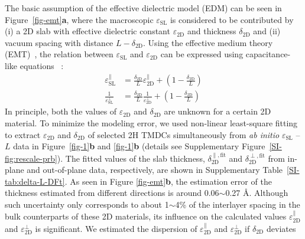 \documentclass[journal=ancac3,manuscript=article,email=true,hyperref=true,keywords=false]{achemso}
\begin{document}
The basic assumption of the effective dielectric model (EDM) can be
seen in Figure~\ref{fig-emt}\textbf{a}, where the macroscopic
$\varepsilon_{\mathrm{SL}}$ is considered to be contributed by (i) a
2D slab with effective dielectric constant $\varepsilon_{\mathrm{2D}}$
and thickness $\delta_{\mathrm{2D}}$ and (ii) vacuum spacing with
distance $L-\delta_{\mathrm{2D}}$. Using the effective medium theory
(EMT)~\cite{Aspnes_1982,Markel_2016}, the relation between
$\varepsilon_{\mathrm{SL}}$ and $\varepsilon_{\mathrm{2D}}$ can be
expressed using capacitance-like
equations~\cite{Matthes_2016,Laturia_2018} :
\begin{subequations}
  \begin{eqnarray}
    \label{eq:emt-1}
    {\displaystyle \varepsilon_{\mathrm{SL}}^{\parallel}} &= {\displaystyle \frac{\delta_{\mathrm{2D}}}{L} \varepsilon_{\mathrm{2D}}^{\parallel} + \left(1 - \frac{\delta_{\mathrm{2D}}}{L} \right)}\\
     \label{eq:emt-2}
    {\displaystyle \frac{1}{\varepsilon_{\mathrm{SL}}^{\perp}}} &= {\displaystyle \frac{\delta_{\mathrm{2D}}}{L} \frac{1}{\varepsilon_{\mathrm{2D}}^{\perp}} + \left(1 - \frac{\delta_{\mathrm{2D}}}{L} \right)}
  \end{eqnarray}
\end{subequations}
In principle, both the values of $\varepsilon_{\mathrm{2D}}$ and
$\delta_{\mathrm{2D}}$ are unknown for a certain 2D material. To
minimize the modeling error, we used non-linear least-square fitting
to extract $\varepsilon_{\mathrm{2D}}$ and $\delta_{\mathrm{2D}}$ of
selected 2H TMDCs simultaneously from \textit{ab initio}
$\varepsilon_{\mathrm{SL}}$ -- $L$ data in
Figure~\ref{fig-1}\textbf{b} and \ref{fig-1}\textbf{b} (details see
Supplementary Figure~\ref{SI-fig:rescale-prb}). The fitted values of
the slab thickness, $\delta_{\mathrm{2D}}^{\parallel, \mathrm{fit}}$
and $\delta_{\mathrm{2D}}^{\perp, \mathrm{fit}}$ from in-plane and
out-of-plane data, respectively, are shown in Supplementary
Table~\ref{SI-tab:delta-L-DFt}. As seen in Figure
\ref{fig-emt}\textbf{b}, the estimation error of the thickness
estimated from different directions is around 0.06$\sim{}$0.27
\AA{}. Although such uncertainty only corresponds to about
1$\sim{}$4\% of the interlayer spacing in the bulk counterparts of
these 2D materials, its influence on the calculated values
$\varepsilon_{\mathrm{2D}}^{\parallel}$ and
$\varepsilon_{\mathrm{2D}}^{\perp}$ is significant. We estimated the
dispersion of $\varepsilon_{\mathrm{2D}}^{\parallel}$ and
$\varepsilon_{\mathrm{2D}}^{\perp}$ if $\delta_{\mathrm{2D}}$ deviates
\end{document}
